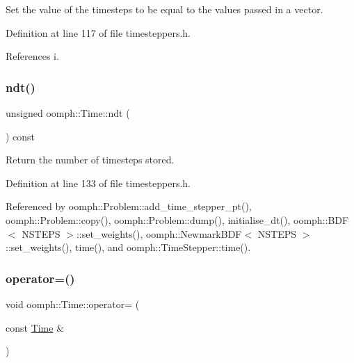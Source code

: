 Set the value of the timesteps to be equal to the values passed in a vector. 



Definition at line 117 of file timesteppers.\+h.



References i.

\mbox{\label{classoomph_1_1Time_ad40953c471eb3ce59921e6870ed755f3}} 
\subsubsection{\texorpdfstring{ndt()}{ndt()}}
{\footnotesize\ttfamily unsigned oomph\+::\+Time\+::ndt (\begin{DoxyParamCaption}{ }\end{DoxyParamCaption}) const\hspace{0.3cm}{\ttfamily [inline]}}



Return the number of timesteps stored. 



Definition at line 133 of file timesteppers.\+h.



Referenced by oomph\+::\+Problem\+::add\+\_\+time\+\_\+stepper\+\_\+pt(), oomph\+::\+Problem\+::copy(), oomph\+::\+Problem\+::dump(), initialise\+\_\+dt(), oomph\+::\+B\+D\+F$<$ N\+S\+T\+E\+P\+S $>$\+::set\+\_\+weights(), oomph\+::\+Newmark\+B\+D\+F$<$ N\+S\+T\+E\+P\+S $>$\+::set\+\_\+weights(), time(), and oomph\+::\+Time\+Stepper\+::time().

\mbox{\label{classoomph_1_1Time_a97eff1a8bf218d7d54ea2728b6599a8b}} 
\subsubsection{\texorpdfstring{operator=()}{operator=()}}
{\footnotesize\ttfamily void oomph\+::\+Time\+::operator= (\begin{DoxyParamCaption}\item[{const \hyperlink{classoomph_1_1Time}{Time} \&}]{ }\end{DoxyParamCaption})\hspace{0.3cm}{\ttfamily [inline]}}



